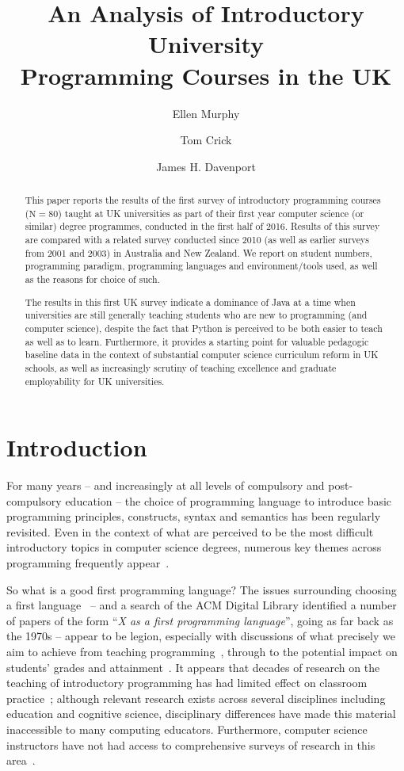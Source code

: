 \documentclass[a4paper,11pt]{article}
\title{An Analysis of Introductory University\\Programming Courses in
  the UK}
\author[1]{Ellen Murphy}
\author[2]{Tom Crick}
\author[3]{James H. Davenport}
\affil[1]{Institute for Mathematical Innovation, University of Bath, UK}
\affil[2]{Dept. of Computing, Cardiff Metropolitan University, UK}
\affil[3]{Dept. of Computer Science, University of Bath, UK}
\affil[1]{\url{e.murphy@bath.ac.uk}}
\affil[2]{\url{tcrick@cardiffmet.ac.uk}}
\affil[3]{\url{j.h.davenport@bath.ac.uk}}
\begin{document}
\maketitle


\begin{abstract}
This paper reports the results of the first survey of introductory
programming courses ($\mathrm{N} = 80$) taught at UK universities as
part of their first year computer science (or similar) degree
programmes, conducted in the first half of 2016. Results of this
survey are compared with a related survey conducted since 2010 (as
well as earlier surveys from 2001 and 2003) in Australia and New
Zealand. We report on student numbers, programming paradigm,
programming languages and environment/tools used, as well as the
reasons for choice of such.

The results in this first UK survey indicate a dominance of Java at a
time when universities are still generally teaching students who
are new to programming (and computer science), despite the fact that
Python is perceived to be both easier to teach as well as to
learn. Furthermore, it provides a starting point for valuable
pedagogic baseline data in the context of substantial computer science
curriculum reform in UK schools, as well as increasingly scrutiny of
teaching excellence and graduate employability for UK universities.
\end{abstract}


\section{Introduction}\label{intro}

For many years -- and increasingly at all levels of compulsory and
post-compulsory education -- the choice of programming language to
introduce basic programming principles, constructs, syntax and
semantics has been regularly revisited. Even in the context of what
are perceived to be the most difficult introductory topics in computer
science degrees, numerous key themes across programming frequently
appear~\cite{dale:2006}.

So what is a good first programming language? The issues surrounding
choosing a first language~\cite{gupta:2004,kaplan:2010} -- and a
search of the ACM Digital Library identified a number of papers of the
form ``{\emph{X as a first programming language}}'', going as far back
as the 1970s -- appear to be legion, especially with discussions of
what precisely we aim to achieve from teaching
programming~\cite{fincher:1999,schult+bennedsen:2006}, through to the
potential impact on students' grades and
attainment~\cite{simon-et-al:2006,bergin+reilly:2006,porter-et-al:2013,ivanovic-et-al:2015}. It
appears that decades of research on the teaching of introductory
programming has had limited effect on classroom
practice~\cite{pears-et-al:2007}; although relevant research exists
across several disciplines including education and cognitive science,
disciplinary differences have made this material inaccessible to many
computing educators. Furthermore, computer science instructors have
not had access to comprehensive surveys of research in this
area~\cite{mccracken-et-al:2001,pears-et-al:2007}.
\end{document}
